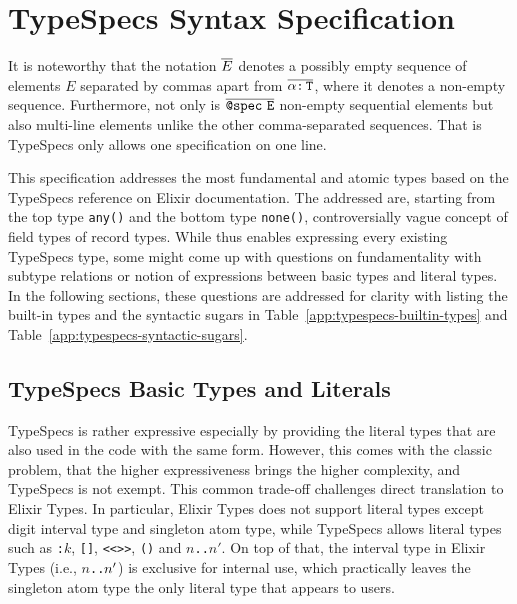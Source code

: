 \documentclass{article}
\begin{document}
\section{TypeSpecs Syntax Specification}



It is noteworthy that the notation $\overline{E}$ denotes a possibly empty sequence of elements $E$ separated by commas apart from $\overline{\alpha\texttt{:}\,\texttt{T}}$, where it denotes a non-empty sequence.
Furthermore, not only is $\overline{\texttt{@spec}\,\,{\texttt{E}}}$ non-empty sequential elements but also multi-line elements unlike the other comma-separated sequences. That is TypeSpecs only allows one specification on one line.

This specification addresses the most fundamental and atomic types based on the TypeSpecs reference on Elixir documentation.
The addressed are, starting from the top type \texttt{any()} and the bottom type \texttt{none()}, controversially vague concept of field types of record types.
While thus enables expressing every existing TypeSpecs type, some might come up with questions on fundamentality with subtype relations or notion of expressions between basic types and literal types.
In the following sections, these questions are addressed for clarity with listing the built-in types and the syntactic sugars in Table~\ref{app:typespecs-builtin-types} and Table~\ref{app:typespecs-syntactic-sugars}.

\subsection{TypeSpecs Basic Types and Literals}
TypeSpecs is rather expressive especially by providing the literal types that are also used in the code with the same form.
However, this comes with the classic problem, that the higher expressiveness brings the higher complexity, and TypeSpecs is not exempt.
This common trade-off challenges direct translation to Elixir Types.
In particular, Elixir Types does not support literal types except digit interval type and singleton atom type, while TypeSpecs allows literal types such as \texttt{:$k$}, \texttt{[]}, \texttt{<<>>}, \texttt{(\fun{$\ov{\TST}$}{\TST})} and \texttt{$n$..$n'$}.
On top of that, the interval type in Elixir Types (i.e., \texttt{$n$..$n^{\prime}$}) is exclusive for internal use, which practically leaves the singleton atom type the only literal type that appears to users.
\end{document}
